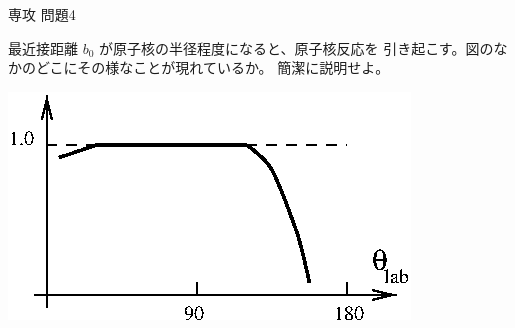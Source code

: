 \documentclass[fleqn]{jbook}
\begin{document}
\begin{question}{専攻 問題4}{}
\begin{subquestions}
\begin{subsubquestions}
  \SubSubQuestion
    最近接距離 $b_0$ が原子核の半径程度になると、原子核反応を
    引き起こす。図のなかのどこにその様なことが現れているか。
    簡潔に説明せよ。

  \end{subsubquestions}

  \begin{center}
    \mbox{\includegraphics[clip]{1996phy4-2.eps}}
  \end{center}

\end{subquestions}
\end{question}
\end{document}
